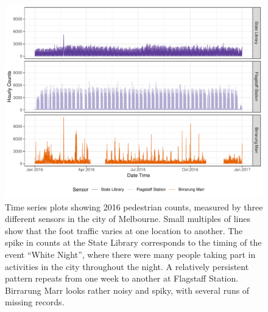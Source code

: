 \documentclass[12pt]{article}
\begin{document}
\begin{figure}

{\centering \includegraphics[width=\textwidth]{figure/time-series-plot-1} 

}

\caption{Time series plots showing 2016 pedestrian counts, measured by three different sensors in the city of Melbourne. Small multiples of lines show that the foot traffic varies at one location to another. The spike in counts at the State Library corresponds to the timing of the event ``White Night'', where there were many people taking part in activities in the city throughout the night. A relatively persistent pattern repeats from one week to another at Flagstaff Station. Birrarung Marr looks rather noisy and spiky, with several runs of missing records.}\label{fig:time-series-plot}
\end{figure}
\end{document}
